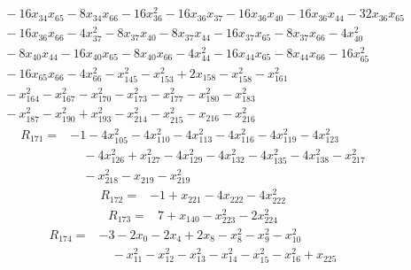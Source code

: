\begin{equation*}
\begin{split}
&\quad -16x_{34} x_{65} - 8x_{34} x_{66} - 16x_{36}^{2} - 16x_{36} x_{37} - 16x_{36} x_{40} - 16x_{36} x_{44} - 32x_{36} x_{65}\\
&\quad -16x_{36} x_{66} - 4x_{37}^{2} - 8x_{37} x_{40} - 8x_{37} x_{44} - 16x_{37} x_{65} - 8x_{37} x_{66} - 4x_{40}^{2}\\
&\quad -8x_{40} x_{44} - 16x_{40} x_{65} - 8x_{40} x_{66} - 4x_{44}^{2} - 16x_{44} x_{65} - 8x_{44} x_{66} - 16x_{65}^{2}\\
&\quad -16x_{65} x_{66} - 4x_{66}^{2} - x_{145}^{2} - x_{153}^{2} + 2x_{158} - x_{158}^{2} - x_{161}^{2}\\
&\quad -x_{164}^{2} - x_{167}^{2} - x_{170}^{2} - x_{173}^{2} - x_{177}^{2} - x_{180}^{2} - x_{183}^{2}\\
&\quad -x_{187}^{2} - x_{190}^{2} + x_{193}^{2} - x_{214}^{2} - x_{215}^{2} - x_{216} - x_{216}^{2}
\end{split}\end{equation*}
\begin{equation*}\begin{split}
R_{171}={}&-1 - 4x_{105}^{2} - 4x_{110}^{2} - 4x_{113}^{2} - 4x_{116}^{2} - 4x_{119}^{2} - 4x_{123}^{2}\\
&\quad -4x_{126}^{2} + x_{127}^{2} - 4x_{129}^{2} - 4x_{132}^{2} - 4x_{135}^{2} - 4x_{138}^{2} - x_{217}^{2}\\
&\quad -x_{218}^{2} - x_{219} - x_{219}^{2}
\end{split}\end{equation*}
\begin{equation*}\begin{split}
R_{172}={}&-1 + x_{221} - 4x_{222} - 4x_{222}^{2}
\end{split}\end{equation*}
\begin{equation*}\begin{split}
R_{173}={}&7 + x_{140} - x_{223}^{2} - 2x_{224}^{2}
\end{split}\end{equation*}
\begin{equation*}\begin{split}
R_{174}={}&-3 - 2x_{0} - 2x_{4} + 2x_{8} - x_{8}^{2} - x_{9}^{2} - x_{10}^{2}\\
&\quad -x_{11}^{2} - x_{12}^{2} - x_{13}^{2} - x_{14}^{2} - x_{15}^{2} - x_{16}^{2} + x_{225}
\end{split}\end{equation*}
\endgroup
